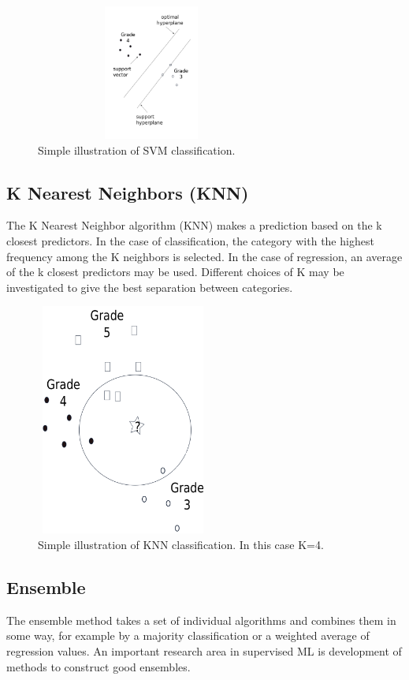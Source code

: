 \documentclass{SBCbookchapter}
\begin{document}
	\begin{figure}[!htpb]
		\centering
		\includegraphics[width=3in,height=1.75in]{SimpleSVM.png}
		\caption{Simple illustration of SVM classification.}
		\label{SimpleSVM}
	\end{figure}
	
	\subsection{K Nearest Neighbors (KNN)}
	The K Nearest Neighbor algorithm (KNN) makes a prediction based on the k closest predictors. In the case of classification, the category with the highest frequency among the K neighbors is selected. In the case of regression, an average of the k closest predictors may be used. Different choices of K may be investigated to give the best separation between categories.
	
	
	\begin{figure}[!htpb]
		\centering
		\includegraphics[width=2.25in,height=3in]{SimpleKNN.png}
		\caption{Simple illustration of KNN classification. In this case K=4.}
		\label{SimpleSVM}
	\end{figure}
	
	\subsection{Ensemble}
	The ensemble method \cite{Diet} takes a set of individual algorithms and combines them in some way, for example by a majority classification or a weighted average of regression values.  An important research area in supervised ML is development of methods to construct good ensembles.
	
\end{document}
